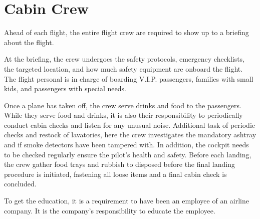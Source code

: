 \section{Cabin Crew}
Ahead of each flight, the entire flight crew are required to show up to a briefing about the flight.

At the briefing, the crew undergoes the safety protocols, emergency checklists, the targeted location, and how much safety equipment are onboard the flight. The flight personal is in charge of boarding V.I.P. passengers, families with small kids, and passengers with special needs.

Once a plane has taken off, the crew serve drinks and food to the passengers. While they serve food and drinks, it is also their responsibility to periodically conduct cabin checks and listen for any unusual noise. Additional task of periodic checks and restock of lavatories, here the crew investigates the mandatory ashtray and if smoke detectors have been tampered with. In addition, the cockpit needs to be checked regularly ensure the pilot's health and safety. Before each landing, the crew gather food trays and rubbish to disposed before the final landing procedure is initiated, fastening all loose items and a final cabin check is concluded.

To get the education, it is a requirement to have been an employee of an airline company. It is the company’s responsibility to educate the employee. 

